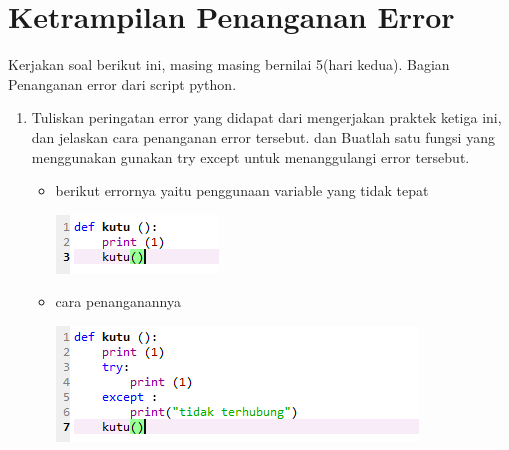 \section{Ketrampilan Penanganan Error}
Kerjakan soal berikut ini, masing masing bernilai 5(hari kedua). Bagian Penanganan error dari script python.
\begin{enumerate}
\item
Tuliskan peringatan error yang didapat dari mengerjakan praktek ketiga ini, dan jelaskan cara penanganan error tersebut.
dan Buatlah satu fungsi yang menggunakan gunakan try except untuk menanggulangi error tersebut.
\begin{itemize}
    \item  berikut errornya yaitu penggunaan variable yang tidak tepat
      \begin{center}
        \centering
        \includegraphics[scale=1]{figures/chapter 3/14.PNG}
    \end{center}
    
        \item  cara penanganannya
      \begin{center}
        \centering
        \includegraphics[scale=1]{figures/chapter 3/15.PNG}
    \end{center}
    
    \end{itemize}
\end{enumerate}



